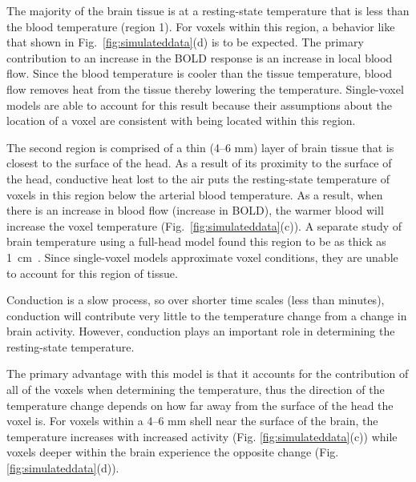     The majority of the brain tissue is at a resting-state temperature that is less than the blood temperature (region 1).  For voxels within this region, a behavior like that shown in Fig.~\ref{fig:simulateddata}(d) is to be expected.  The primary contribution to an increase in the BOLD response is an increase in local blood flow.  Since the blood temperature is cooler than the tissue temperature, blood flow removes heat from the tissue thereby lowering the temperature.  Single-voxel models are able to account for this result because their assumptions about the location of a voxel are consistent with being located within this region.
    
    The second region is comprised of a thin (4--6 mm) layer of brain tissue that is closest to the surface of the head.  As a result of its proximity to the surface of the head, conductive heat lost to the air puts the resting-state temperature of voxels in this region below the arterial blood temperature.  As a result, when there is an increase in blood flow (increase in BOLD), the warmer blood will increase the voxel temperature (Fig.~\ref{fig:simulateddata}(c)).  A separate study of brain temperature using a full-head model found this region to be as thick as 1~cm~\citep{nelson1998}.  Since single-voxel models approximate voxel conditions, they are unable to account for this region of tissue.
    
    Conduction is a slow process, so over shorter time scales (less than  minutes), conduction will contribute very little to the temperature change from a change in brain activity.  However, conduction plays an important role in determining the resting-state temperature.  
    
    The primary advantage with this model is that it accounts for the contribution of all of the voxels when determining the temperature, thus the direction of the temperature change depends on how far away from the surface of the head the voxel is. For voxels within a 4--6 mm shell near the surface of the brain, the temperature increases with increased activity (Fig. \ref{fig:simulateddata}(c)) while voxels deeper within the brain experience the opposite change (Fig. \ref{fig:simulateddata}(d)).
    
